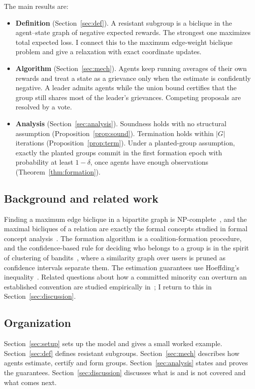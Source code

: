 \documentclass[11pt]{article}
\theoremstyle{plain}
\theoremstyle{definition}
\theoremstyle{remark}
\begin{document}
\noindent The main results are:
\begin{itemize}
    \item \textbf{Definition} (Section~\ref{sec:def}). A resistant subgroup is a biclique in the agent--state graph of negative expected rewards.
          The strongest one maximizes total expected loss. I connect this to the maximum edge-weight biclique problem and give a relaxation
          with exact coordinate updates.
    \item \textbf{Algorithm} (Section~\ref{sec:mech}). Agents keep running averages of their own rewards and treat a state as a grievance only when
          the estimate is confidently negative. A leader admits agents while the union bound certifies that the group still shares most of the leader's
          grievances. Competing proposals are resolved by a vote.
    \item \textbf{Analysis} (Section~\ref{sec:analysis}). Soundness holds with no structural assumption (Proposition~\ref{prop:sound}).
          Termination holds within $|G|$ iterations (Proposition~\ref{prop:term}).
          Under a planted-group assumption, exactly the planted groups commit in the first formation epoch with probability at least $1-\delta$,
          once agents have enough observations (Theorem~\ref{thm:formation}).
\end{itemize}
 
\subsection{Background and related work}
Finding a maximum edge biclique in a bipartite graph is NP-complete~\cite{peeters}, and the maximal bicliques of a relation are exactly the formal
concepts studied in formal concept analysis~\cite{fca}. The formation algorithm is a coalition-formation procedure,
and the confidence-based rule for deciding who belongs to a group is in the spirit of clustering of bandits~\cite{club}, where a
similarity graph over users is pruned as confidence intervals separate them.
The estimation guarantees use Hoeffding's inequality~\cite{hoeffding}.
Related questions about how a committed minority can overturn an established convention are studied empirically in~\cite{centola};
I return to this in Section~\ref{sec:discussion}.
 
\subsection{Organization}
Section~\ref{sec:setup} sets up the model and gives a small worked example.
Section~\ref{sec:def} defines resistant subgroups.
Section~\ref{sec:mech} describes how agents estimate, certify and form groups.
Section~\ref{sec:analysis} states and proves the guarantees.
Section~\ref{sec:discussion} discusses what is and is not covered and what comes next.
 
\end{document}
